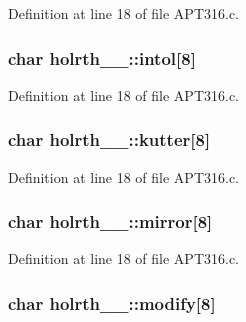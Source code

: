 Definition at line 18 of file A\+P\+T316.\+c.

\subsubsection[{\texorpdfstring{intol}{intol}}]{\setlength{\rightskip}{0pt plus 5cm}char holrth\+\_\+\_\+\+::intol\mbox{[}8\mbox{]}}\hypertarget{structholrth__1___aa4af76563cee6e31925cdc86743662b4}{}\label{structholrth__1___aa4af76563cee6e31925cdc86743662b4}


Definition at line 18 of file A\+P\+T316.\+c.

\subsubsection[{\texorpdfstring{kutter}{kutter}}]{\setlength{\rightskip}{0pt plus 5cm}char holrth\+\_\+\_\+\+::kutter\mbox{[}8\mbox{]}}\hypertarget{structholrth__1___a5ff73d9b6c847252e17e1ff8633b83a3}{}\label{structholrth__1___a5ff73d9b6c847252e17e1ff8633b83a3}


Definition at line 18 of file A\+P\+T316.\+c.

\subsubsection[{\texorpdfstring{mirror}{mirror}}]{\setlength{\rightskip}{0pt plus 5cm}char holrth\+\_\+\_\+\+::mirror\mbox{[}8\mbox{]}}\hypertarget{structholrth__1___a09468539aa48054eb4a8327c14efdee4}{}\label{structholrth__1___a09468539aa48054eb4a8327c14efdee4}


Definition at line 18 of file A\+P\+T316.\+c.

\subsubsection[{\texorpdfstring{modify}{modify}}]{\setlength{\rightskip}{0pt plus 5cm}char holrth\+\_\+\_\+\+::modify\mbox{[}8\mbox{]}}\hypertarget{structholrth__1___a25c071912cb20bc10c649424d8474134}{}\label{structholrth__1___a25c071912cb20bc10c649424d8474134}



